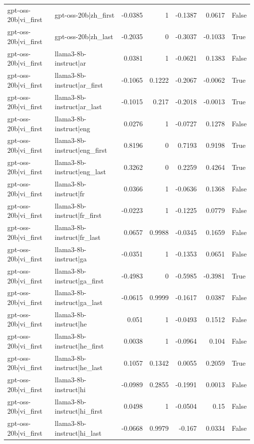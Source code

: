 \begin{table}
\begin{tabular}{l l r r r r l}
gpt-oss-20b|vi_first & gpt-oss-20b|zh_first & -0.0385 & 1 & -0.1387 & 0.0617 & False \\
gpt-oss-20b|vi_first & gpt-oss-20b|zh_last & -0.2035 & 0 & -0.3037 & -0.1033 & True \\
gpt-oss-20b|vi_first & llama3-8b-instruct|ar & 0.0381 & 1 & -0.0621 & 0.1383 & False \\
gpt-oss-20b|vi_first & llama3-8b-instruct|ar_first & -0.1065 & 0.1222 & -0.2067 & -0.0062 & True \\
gpt-oss-20b|vi_first & llama3-8b-instruct|ar_last & -0.1015 & 0.217 & -0.2018 & -0.0013 & True \\
gpt-oss-20b|vi_first & llama3-8b-instruct|eng & 0.0276 & 1 & -0.0727 & 0.1278 & False \\
gpt-oss-20b|vi_first & llama3-8b-instruct|eng_first & 0.8196 & 0 & 0.7193 & 0.9198 & True \\
gpt-oss-20b|vi_first & llama3-8b-instruct|eng_last & 0.3262 & 0 & 0.2259 & 0.4264 & True \\
gpt-oss-20b|vi_first & llama3-8b-instruct|fr & 0.0366 & 1 & -0.0636 & 0.1368 & False \\
gpt-oss-20b|vi_first & llama3-8b-instruct|fr_first & -0.0223 & 1 & -0.1225 & 0.0779 & False \\
gpt-oss-20b|vi_first & llama3-8b-instruct|fr_last & 0.0657 & 0.9988 & -0.0345 & 0.1659 & False \\
gpt-oss-20b|vi_first & llama3-8b-instruct|ga & -0.0351 & 1 & -0.1353 & 0.0651 & False \\
gpt-oss-20b|vi_first & llama3-8b-instruct|ga_first & -0.4983 & 0 & -0.5985 & -0.3981 & True \\
gpt-oss-20b|vi_first & llama3-8b-instruct|ga_last & -0.0615 & 0.9999 & -0.1617 & 0.0387 & False \\
gpt-oss-20b|vi_first & llama3-8b-instruct|he & 0.051 & 1 & -0.0493 & 0.1512 & False \\
gpt-oss-20b|vi_first & llama3-8b-instruct|he_first & 0.0038 & 1 & -0.0964 & 0.104 & False \\
gpt-oss-20b|vi_first & llama3-8b-instruct|he_last & 0.1057 & 0.1342 & 0.0055 & 0.2059 & True \\
gpt-oss-20b|vi_first & llama3-8b-instruct|hi & -0.0989 & 0.2855 & -0.1991 & 0.0013 & False \\
gpt-oss-20b|vi_first & llama3-8b-instruct|hi_first & 0.0498 & 1 & -0.0504 & 0.15 & False \\
gpt-oss-20b|vi_first & llama3-8b-instruct|hi_last & -0.0668 & 0.9979 & -0.167 & 0.0334 & False \\

\end{tabular}
\end{table}
